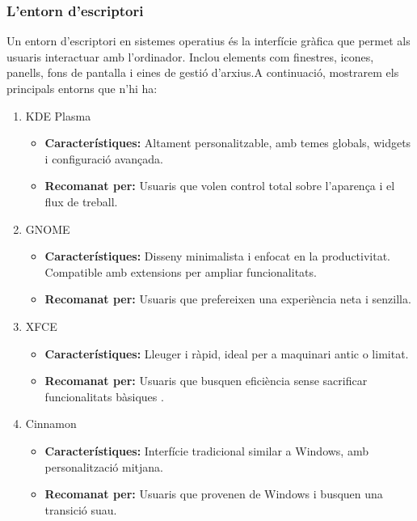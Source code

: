 \subsubsection{L'entorn d'escriptori}
Un entorn d'escriptori en sistemes operatius és la interfície gràfica que permet als usuaris interactuar amb l'ordinador. Inclou elements com finestres, icones, panells, fons de pantalla i eines de gestió d'arxius.A continuació, mostrarem els principals entorns que n'hi ha:
\begin{enumerate}
 \item KDE Plasma
 \begin{itemize}
  \item \textbf{Característiques: } Altament personalitzable, amb temes globals, widgets i configuració avançada.
  \item \textbf{Recomanat per:} Usuaris que volen control total sobre l'aparença i el flux de treball.
 \end{itemize}

 \item GNOME
 \begin{itemize}
  \item \textbf{Característiques:} Disseny minimalista i enfocat en la productivitat. Compatible amb extensions per ampliar funcionalitats.
  \item \textbf{Recomanat per: }  Usuaris que prefereixen una experiència neta i senzilla.
 \end{itemize}


 \item XFCE
\begin{itemize}
  \item \textbf{Característiques:} Lleuger i ràpid, ideal per a maquinari antic o limitat.
  \item \textbf{Recomanat per: } Usuaris que busquen eficiència sense sacrificar funcionalitats bàsiques .
 \end{itemize}

 \item Cinnamon
\begin{itemize}
  \item \textbf{Característiques:} Interfície tradicional similar a Windows, amb personalització mitjana.
  \item \textbf{Recomanat per: } Usuaris que provenen de Windows i busquen una transició suau.
 \end{itemize}

\end{enumerate}


